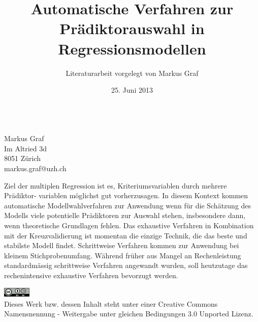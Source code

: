 \documentclass[german,12pt,doc]{apa}
\begin{document}
\begin{titlepage}

\title{Automatische Verfahren zur Prädiktorauswahl in Regressionsmodellen}
\author{Literaturarbeit vorgelegt von Markus Graf}
\date{25. Juni 2013}

\maketitle
\vfill 
~ \\
Markus Graf\\
Im Altried 3d\\
8051 Zürich\\
markus.graf@uzh.ch
\end{titlepage}
\thispagestyle{empty}
Ziel der multiplen Regression ist es, Kriteriumsvariablen durch mehrere Prädiktor- variablen möglichst gut vorherzusagen. In diesem Kontext kommen automatische Modellwahlverfahren zur Anwendung wenn für die Schätzung des Modells viele potentielle Prädiktoren zur Auswahl stehen, insbesondere dann, wenn theoretische Grundlagen fehlen. Das exhaustive Verfahren in Kombination mit der Kreuzvalidierung ist momentan die einzige Technik, die das beste und stabilste Modell findet. Schrittweise Verfahren kommen zur Anwendung bei kleinem Stichprobenumfang. Während früher aus Mangel an Rechenleistung standardmässig schrittweise Verfahren angewandt wurden, soll heutzutage das rechenintensive exhaustive Verfahren bevorzugt werden.
\vfill
\begin{center}
\includegraphics[width=0.1\textwidth]{cc_by_sa.jpg}\\
Dieses Werk bzw. dessen Inhalt steht unter einer Creative Commons Namensnennung - Weitergabe unter gleichen Bedingungen 3.0 Unported Lizenz.
\end{center}
\setlength{\parindent}{0pt}
\newpage
\thispagestyle{empty}
\begin{spacing}{0.01}
\tableofcontents
\end{spacing}
\newpage
\end{document}
